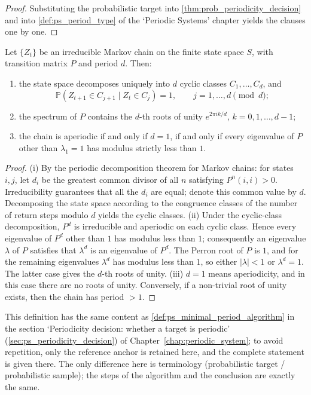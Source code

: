 \begin{proof}
Substituting the probabilistic target into \cref{thm:prob_periodicity_decision} and into \cref{def:ps_period_type} of the `Periodic Systems' chapter yields the clauses one by one.
\end{proof}

\begin{lemma}\label{lem:markov_period}
Let $\{Z_t\}$ be an irreducible Markov chain on the finite state space $S$, with transition matrix $P$ and period $d$. Then:
\begin{enumerate}[label=(\roman*)]
    \item the state space decomposes uniquely into $d$ cyclic classes $C_1,\dots,C_d$, and
    \[
    \mathbb P(Z_{t+1}\in C_{j+1}\mid Z_t\in C_j)=1,\qquad j=1,\dots,d\pmod d;
    \]
    \item the spectrum of $P$ contains the $d$-th roots of unity $e^{2\pi i k/d}$, $k=0,1,\dots,d-1$;
    \item the chain is aperiodic if and only if $d=1$, if and only if every eigenvalue of $P$ other than $\lambda_1=1$ has modulus strictly less than $1$.
\end{enumerate}
\end{lemma}

\begin{proof}
(i) By the periodic decomposition theorem for Markov chains: for states $i,j$, let $d_i$ be the greatest common divisor of all $n$ satisfying $P^n(i,i)>0$. Irreducibility guarantees that all the $d_i$ are equal; denote this common value by $d$. Decomposing the state space according to the congruence classes of the number of return steps modulo $d$ yields the cyclic classes.
(ii) Under the cyclic-class decomposition, $P^d$ is irreducible and aperiodic on each cyclic class. Hence every eigenvalue of $P^d$ other than $1$ has modulus less than $1$; consequently an eigenvalue $\lambda$ of $P$ satisfies that $\lambda^d$ is an eigenvalue of $P^d$. The Perron root of $P$ is $1$, and for the remaining eigenvalues $\lambda^d$ has modulus less than $1$, so either $|\lambda|<1$ or $\lambda^d=1$. The latter case gives the $d$-th roots of unity.
(iii) $d=1$ means aperiodicity, and in this case there are no roots of unity. Conversely, if a non-trivial root of unity exists, then the chain has period $>1$.
\end{proof}

\begin{definition}\label{def:prob_minimal_period_algorithm}
This definition has the same content as \cref{def:ps_minimal_period_algorithm} in the section `Periodicity decision: whether a target is periodic' (\cref{sec:ps_periodicity_decision}) of Chapter~\ref{chap:periodic_system}; to avoid repetition, only the reference anchor is retained here, and the complete statement is given there. The only difference here is terminology (probabilistic target / probabilistic sample); the steps of the algorithm and the conclusion are exactly the same.
\end{definition}


